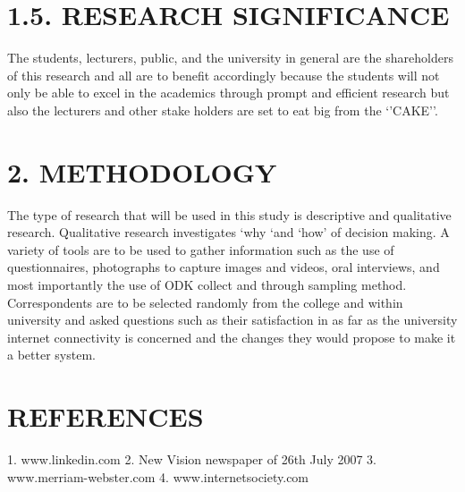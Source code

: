 \documentclass[11pt]{article}
\begin{document}
\section{1.5.	RESEARCH SIGNIFICANCE}
     The students, lecturers, public, and the university in general are the shareholders of this research and all are to benefit accordingly because the students will not only be able to excel in the academics through prompt and efficient research but also the lecturers and other stake holders are set to eat big from the ‘’CAKE’’.

     
\section{2.	METHODOLOGY}
       The type of research that will be used in this study is descriptive and qualitative research. 
Qualitative research investigates ‘why ‘and ‘how’ of decision making. A variety of tools are to be used to gather information such as the use of questionnaires, photographs to capture images and videos, oral interviews, and most importantly the use of ODK collect and through sampling method. Correspondents are to be selected randomly from the college and within university and asked questions such as their satisfaction in as far as the university internet connectivity is concerned and the changes they would propose to make it a better system.


\section{REFERENCES}
1.	www.linkedin.com
2.	New Vision newspaper of 26th July 2007
3.	www.merriam-webster.com
4.	www.internetsociety.com
\end{document}
